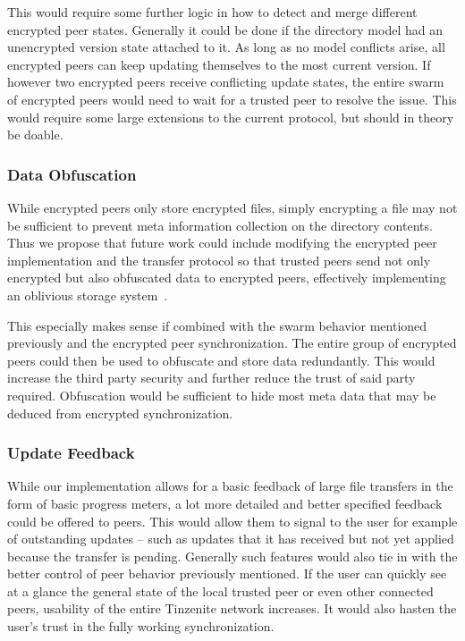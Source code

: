 This would require some further logic in how to detect and merge different encrypted peer states.
Generally it could be done if the directory model had an unencrypted version state attached to it.
As long as no model conflicts arise, all encrypted peers can keep updating themselves to the most current version.
If however two encrypted peers receive conflicting update states, the entire swarm of encrypted peers would need to wait for a trusted peer to resolve the issue.
This would require some large extensions to the current protocol, but should in theory be doable.

\subsubsection{Data Obfuscation}
\label{subs:Data Obfuscation}

While encrypted peers only store encrypted files, simply encrypting a file may not be sufficient to prevent meta information collection on the directory contents.
Thus we propose that future work could include modifying the encrypted peer implementation and the transfer protocol so that trusted peers send not only encrypted but also obfuscated data to encrypted peers, effectively implementing an oblivious storage system~\cite{goldreich1996software}.

This especially makes sense if combined with the swarm behavior mentioned previously and the encrypted peer synchronization.
The entire group of encrypted peers could then be used to obfuscate and store data redundantly.
This would increase the third party security and further reduce the trust of said party required.
Obfuscation would be sufficient to hide most meta data that may be deduced from encrypted synchronization.

\subsubsection{Update Feedback}
\label{subs:Update Feedback}

While our implementation allows for a basic feedback of large file transfers in the form of basic progress meters, a lot more detailed and better specified feedback could be offered to peers.
This would allow them to signal to the user for example of outstanding updates -- such as updates that it has received but not yet applied because the transfer is pending.
Generally such features would also tie in with the better control of peer behavior previously mentioned.
If the user can quickly see at a glance the general state of the local trusted peer or even other connected peers, usability of the entire Tinzenite network increases.
It would also hasten the user's trust in the fully working synchronization.

